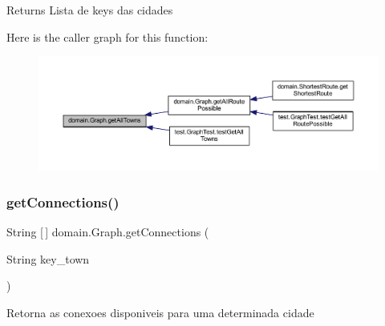 \begin{DoxyReturn}{Returns}
Lista de keys das cidades 
\end{DoxyReturn}
Here is the caller graph for this function\+:\nopagebreak
\begin{figure}[H]
\begin{center}
\leavevmode
\includegraphics[width=350pt]{classdomain_1_1_graph_a3789a71ab36974dce8c6c6aac41007f3_icgraph}
\end{center}
\end{figure}
\mbox{\label{classdomain_1_1_graph_adab0f0e6ae7af913998f537aa0fe62f1}} 
\subsubsection{\texorpdfstring{get\+Connections()}{getConnections()}}
{\footnotesize\ttfamily String \mbox{[}$\,$\mbox{]} domain.\+Graph.\+get\+Connections (\begin{DoxyParamCaption}\item[{String}]{key\+\_\+town }\end{DoxyParamCaption})}

Retorna as conexoes disponiveis para uma determinada cidade


